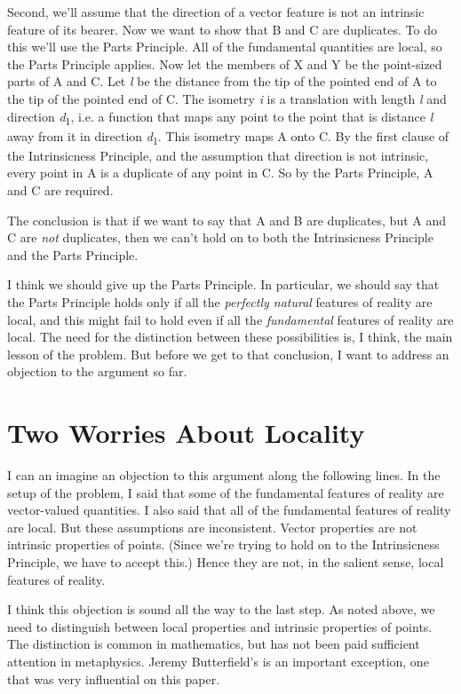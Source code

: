 Second, we'll assume that the direction of a vector feature is not an intrinsic feature of its bearer. Now we want to show that B and C are duplicates. To do this we'll use the Parts Principle. All of the fundamental quantities are local, so the Parts Principle applies. Now let the members of X and Y be the point-sized parts of A and C. Let \textit{l} be the distance from the tip of the pointed end of A to the tip of the pointed end of C. The isometry \textit{i} is a translation with length \textit{l} and direction \textit{d}\textsubscript{1}, i.e. a function that maps any point to the point that is distance \textit{l} away from it in direction \textit{d}\textsubscript{1}. This isometry maps A onto C. By the first clause of the Intrinsicness Principle, and the assumption that direction is not intrinsic, every point in A is a duplicate of any point in C. So by the Parts Principle, A and C are required.

The conclusion is that if we want to say that A and B are duplicates, but A and C are \textit{not} duplicates, then we can't hold on to both the Intrinsicness Principle and the Parts Principle.

I think we should give up the Parts Principle. In particular, we should say that the Parts Principle holds only if all the \textit{perfectly natural} features of reality are local, and this might fail to hold even if all the \textit{fundamental} features of reality are local. The need for the distinction between these possibilities is, I think, the main lesson of the problem. But before we get to that conclusion, I want to address an objection to the argument so far. 

\section{Two Worries About Locality}

I can an imagine an objection to this argument along the following lines. In the setup of the problem, I said that some of the fundamental features of reality are vector-valued quantities. I also said that all of the fundamental features of reality are local. But these assumptions are inconsistent. Vector properties are not intrinsic properties of points. (Since we're trying to hold on to the Intrinsicness Principle, we have to accept this.) Hence they are not, in the salient sense, local features of reality.

I think this objection is sound all the way to the last step. As noted above, we need to distinguish between local properties and intrinsic properties of points. The distinction is common in mathematics, but has not been paid sufficient attention in metaphysics. Jeremy Butterfield's \citeyearpar{Butterfield2006} is an important exception, one that was very influential on this paper. 

